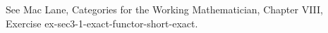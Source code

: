 See Mac Lane, Categories for the Working Mathematician, Chapter VIII, Exercise ex-sec3-1-exact-functor-short-exact.
